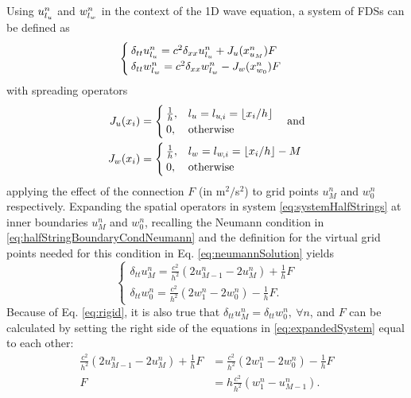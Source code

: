 Using $u_{l_u}^n$ and $w_{l_w}^n$ in the context of the 1D wave equation, a system of FDSs can be defined as
\begin{equation}
    \begin{cases}\label{eq:systemHalfStrings}
        \delta_{tt}u_{l_u}^n = c^2\delta_{xx}u_{l_u}^n + J_u(x_{u_M}^n)F\\
        \delta_{tt}w_{l_w}^n = c^2\delta_{xx}w_{l_w}^n - J_w(x_{w_0}^n)F
    \end{cases}
\end{equation}
with spreading operators
\begin{equation}\label{eq:spreadingOperators}
    \begin{aligned}
    J_u(x_i)& =
    \begin{cases}
        \frac{1}{h}, & {l_u} = {l_u}_{\!,i} = \lfloor x_i/h\rfloor\\
        0,& \text{otherwise}
    \end{cases}
    \quad\text{and}\\
    J_w(x_i) &=
    \begin{cases}
        \frac{1}{h}, & {l_w} = {l_w}_{\!,i} = \lfloor x_i/h \rfloor - M\\
        0,& \text{otherwise}
    \end{cases}
\end{aligned}
\end{equation}
applying the effect of the connection %
$F$ (in m$^2/$s$^2$) to grid points $u_M^n$ and $w_0^n$ respectively.
%
Expanding the spatial operators in system \eqref{eq:systemHalfStrings} at inner boundaries $u_M^n$ and $w_0^n$, recalling the Neumann condition in  \eqref{eq:halfStringBoundaryCondNeumann} and the definition for the virtual grid points needed for this condition in Eq. \eqref{eq:neumannSolution} yields
\begin{equation}\label{eq:expandedSystem}
    \begin{cases}
        \delta_{tt}u_M^n = \frac{c^2}{h^2}(2u_{M-1}^n-2u_M^n) + \frac{1}{h}F\\
        \delta_{tt}w_0^n = \frac{c^2}{h^2}(2w_1^n-2w_0^n) - \frac{1}{h}F.
    \end{cases}
\end{equation}
Because of Eq. \eqref{eq:rigid}, it is also true that $\delta_{tt}u_M^n = \delta_{tt}w_0^n, \ \forall n$, and $F$ can be calculated by setting the right side of the equations in \eqref{eq:expandedSystem} equal to each other:
\begin{align*}
     \frac{c^2}{h^2}(2u_{M-1}^n-2u_M^n) + \frac{1}{h} F&= 
     \frac{c^2}{h^2}(2w_1^n-2w_0^n) - \frac{1}{h} F\nonumber\\
    F &= h \frac{c^2}{h^2}(w_1^n - u_{M-1}^n).
\end{align*}
